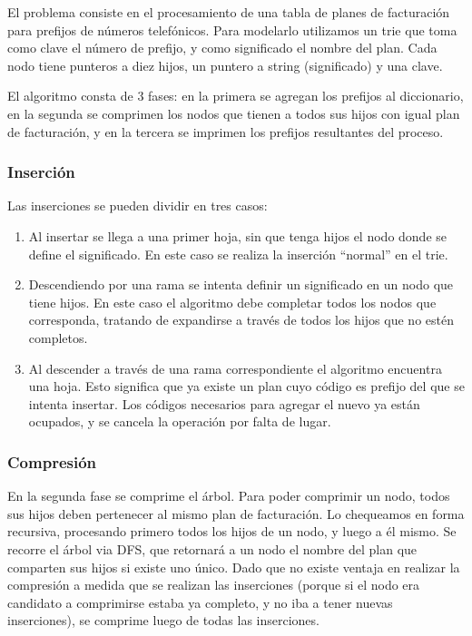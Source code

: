El problema consiste en el procesamiento de una tabla de planes de facturación
para prefijos de números telefónicos. Para modelarlo utilizamos un trie
que toma como clave el número de prefijo, y como significado el nombre del
plan. Cada nodo tiene punteros a diez hijos, un puntero a string (significado)
y una clave.

El algoritmo consta de 3 fases: en la primera se agregan los prefijos al
diccionario, en la segunda se comprimen los nodos que tienen a todos sus hijos
con igual plan de facturación, y en la tercera se imprimen los prefijos
resultantes del proceso.

\subsubsection*{Inserción}

Las inserciones se pueden dividir en tres casos:

\begin{enumerate}
  \item Al insertar se llega a una primer hoja, sin que tenga hijos el nodo
  donde se define el significado. En este caso se realiza la inserción ``normal''
  en el trie.

  \item Descendiendo por una rama se intenta definir un significado en un nodo
  que tiene hijos. En este caso el algoritmo debe completar todos los nodos que
  corresponda, tratando de expandirse a través de todos los hijos que no
  estén completos.

  \item Al descender a través de una rama correspondiente el algoritmo encuentra
  una hoja. Esto significa que ya existe un plan cuyo código es prefijo del
  que se intenta insertar. Los códigos necesarios para agregar el nuevo ya están
  ocupados, y se cancela la operación por falta de lugar.
\end{enumerate}

\subsubsection*{Compresión}

En la segunda fase se comprime el árbol. Para poder comprimir un nodo, todos
sus hijos deben pertenecer al mismo plan de facturación. Lo chequeamos en
forma recursiva, procesando primero todos los hijos de un nodo, y luego a
él mismo. Se recorre el árbol via DFS, que retornará a un nodo el nombre
del plan que comparten sus hijos si existe uno único. Dado que no existe
ventaja en realizar la compresión a medida que se realizan las inserciones
(porque si el nodo era candidato a comprimirse estaba ya completo, y no
iba a tener nuevas inserciones), se comprime luego de todas las inserciones.

